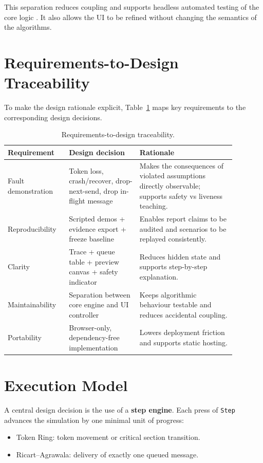 This separation reduces coupling and supports headless automated testing of the core logic \cite{gamma1994design}. It also allows the UI to be refined without changing the semantics of the algorithms.

\section{Requirements-to-Design Traceability}
To make the design rationale explicit, Table~\ref{tab:req-trace} maps key requirements to the corresponding design decisions.

\begin{table}[htbp]
\centering
\small
\renewcommand{\arraystretch}{1.15}
\begin{tabular}{p{0.22\linewidth} p{0.28\linewidth} p{0.38\linewidth}}
\toprule
\textbf{Requirement} & \textbf{Design decision} & \textbf{Rationale} \\
\midrule
Fault demonstration & Token loss, crash/recover, drop-next-send, drop in-flight message & Makes the consequences of violated assumptions directly observable; supports safety vs liveness teaching. \\
Reproducibility & Scripted demos + evidence export + freeze baseline & Enables report claims to be audited and scenarios to be replayed consistently. \\
Clarity & Trace + queue table + preview canvas + safety indicator & Reduces hidden state and supports step-by-step explanation. \\
Maintainability & Separation between core engine and UI controller & Keeps algorithmic behaviour testable and reduces accidental coupling. \\
Portability & Browser-only, dependency-free implementation & Lowers deployment friction and supports static hosting. \\
\bottomrule
\end{tabular}
\caption{Requirements-to-design traceability.}
\label{tab:req-trace}
\end{table}

\section{Execution Model}
A central design decision is the use of a \textbf{step engine}. Each press of \texttt{Step} advances the simulation by one minimal unit of progress:
\begin{itemize}
  \item Token Ring: token movement or critical section transition.
  \item Ricart--Agrawala: delivery of exactly one queued message.
\end{itemize}

